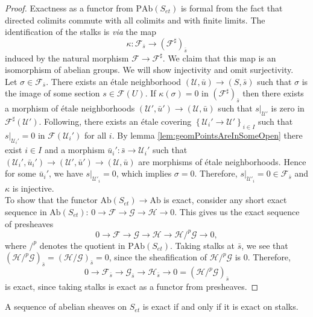 \begin{proof}
Exactness as a functor from $\text{PAb}(S_{et})$ is formal from the fact that 
directed colimits commute with all colimits and with finite limits. The 
identification of the stalks is {\it via} the map
$$
\kappa : \mathcal{F}_{\bar s}\longrightarrow 
\left(\mathcal{F}^\sharp\right)_{\bar s}
$$
induced by the natural morphism $\mathcal{F}\to \mathcal{F}^\sharp$.  We claim 
that this map is an isomorphism of abelian groups.  We will show injectivity 
and omit surjectivity. 
\\
Let $\sigma\in \mathcal{F}_{\bar s}$. There exists an \'etale neighborhood 
$(\mathcal{U}, \bar u)\to (S, \bar s)$ such that $\sigma$ is the image of some 
section $s \in \mathcal{F}(U)$. If $\kappa(\sigma) = 0$ in 
$(\mathcal{F}^\sharp)_{\bar s}$ then there exists a morphism of \'etale 
neighborhoods $(\mathcal{U}', \bar u')\to (\mathcal{U}, \bar u)$ such that 
$s|_{\mathcal{U}'}$ is zero in $\mathcal{F}^\sharp(\mathcal{U}')$. Following, 
there exists an \'etale covering $\left\{\mathcal{U}_i'\to 
\mathcal{U}'\right\}_{i\in I}$ such that $s|_{\mathcal{U}_i'}=0$ in 
$\mathcal{F}(\mathcal{U}_i')$ for all $i$. By lemma 
\ref{lem:geomPointsAreInSomeOpen} there exist  $i \in I$ and a morphism $\bar 
u_i': \bar s \to \mathcal{U}_i'$ such that  $(\mathcal{U}_i', \bar u_i')\to 
(\mathcal{U}', \bar u')\to (\mathcal{U}, \bar u)$ are morphisms of \'etale 
neighborhoods. Hence for some $\bar u_i'$, we have $s|_{\mathcal{U}'_i}=0$, 
which implies $\sigma = 0$.  Therefore, $s|_{\mathcal{U}'_i} = 0 \in 
\mathcal{F}_{\bar s}$ and $\kappa$ is injective.
\\
To show that the functor $\text{Ab}(S_{et}) \to \text{Ab}$ is exact, consider 
any short exact sequence in $\text{Ab}(S_{et})$:
$
0\to \mathcal{F}\to \mathcal{G}\to \mathcal H \to 0.
$
This gives us the  exact sequence of presheaves
$$
0 \to \mathcal{F}\to \mathcal{G} \to \mathcal H\to \mathcal H/^p\mathcal{G} \to 
0,
$$
where $/^p$ denotes the quotient in $\text{PAb}(S_{et})$. Taking stalks at 
$\bar s$, we see that $(\mathcal H /^p\mathcal{G})_{\bar{s}} = (\mathcal H 
/\mathcal{G})_{\bar{s}} = 0$, since the sheafification of $\mathcal 
H/^p\mathcal{G}$ is $0$. 
Therefore, 
$$
0\to \mathcal{F}_{\bar s	} \to \mathcal{G}_{\bar s} \to 
\mathcal{H}_{\bar s} \to 0 = (\mathcal H/^p\mathcal{G})_{\bar s}
$$
is exact, since taking stalks is exact as a functor from presheaves.
\end{proof}

\begin{theorem}
A sequence of abelian sheaves on $S_{et}$ is exact if and only if it is exact 
on stalks.  
\end{theorem}


